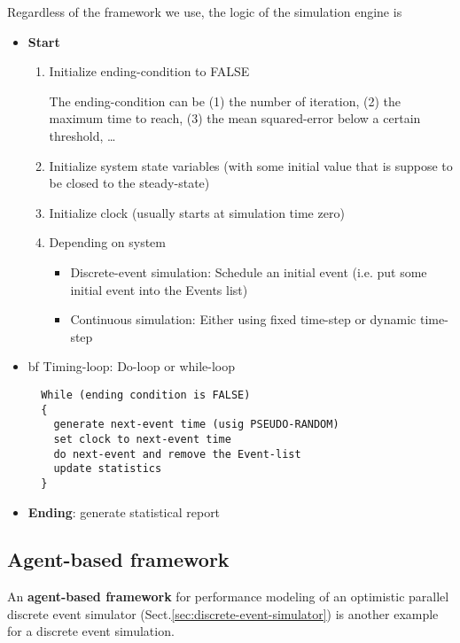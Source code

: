 Regardless of the framework we use, the logic of the simulation engine is 
\begin{itemize}
  \item {\bf Start}
  \begin{enumerate}
  \item Initialize ending-condition to FALSE
  
  The ending-condition can be (1) the number of iteration, (2) the maximum time
  to reach, (3) the mean squared-error below a certain threshold, \ldots
  
  
  \item Initialize system state variables (with some initial value that is
  suppose to be closed to the steady-state)
  
  \item Initialize clock (usually starts at simulation time zero)
  
  
  \item Depending on system
  \begin{itemize}
    \item Discrete-event simulation: Schedule an initial event (i.e. put some
    initial event into the Events list)

    \item Continuous simulation: Either using fixed time-step or dynamic
    time-step
    
    
   \end{itemize}
  \end{enumerate}
  
  \item {bf Timing-loop}: Do-loop or while-loop
  \begin{verbatim}
  While (ending condition is FALSE)
  {
    generate next-event time (usig PSEUDO-RANDOM)
    set clock to next-event time
    do next-event and remove the Event-list
    update statistics
  }
  \end{verbatim}
  
  \item {\bf Ending}: generate statistical report
\end{itemize}



\subsection{Agent-based framework}


An {\bf agent-based framework} for performance modeling of an optimistic
parallel discrete event simulator (Sect.\ref{sec:discrete-event-simulator}) is
another example for a discrete event simulation.





